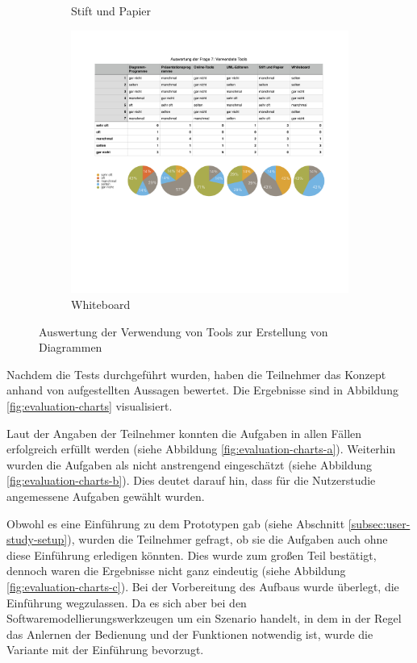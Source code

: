\begin{figure}[hbt]
\begin{minipage}{.65\textwidth}
\begin{subfigure}[t]{\subfigurewidth}
        \caption{Stift und Papier}
        \label{fig:used-tools-charts-e}
    \end{subfigure}
    \begin{subfigure}[t]{\subfigurewidth}
        \centering
        \includegraphics[scale=\graphicsscale]{assets/used-tools-charts-f}
        \caption{Whiteboard}
        \label{fig:used-tools-charts-f}
    \end{subfigure}
\end{minipage}
\caption{Auswertung der Verwendung von Tools zur Erstellung von Diagrammen}
\label{fig:used-tools-charts}
\end{figure}

Nachdem die Tests durchgeführt wurden, haben die Teilnehmer das Konzept anhand von aufgestellten Aussagen bewertet. Die Ergebnisse sind in Abbildung \ref{fig:evaluation-charts} visualisiert.

Laut der Angaben der Teilnehmer konnten die Aufgaben in allen Fällen erfolgreich erfüllt werden (siehe Abbildung \ref{fig:evaluation-charts-a}). Weiterhin wurden die Aufgaben als nicht anstrengend eingeschätzt (siehe Abbildung \ref{fig:evaluation-charts-b}). Dies deutet darauf hin, dass für die Nutzerstudie angemessene Aufgaben gewählt wurden.

Obwohl es eine Einführung zu dem Prototypen gab (siehe Abschnitt \ref{subsec:user-study-setup}), wurden die Teilnehmer gefragt, ob sie die Aufgaben auch ohne diese Einführung erledigen könnten. Dies wurde zum großen Teil bestätigt, dennoch waren die Ergebnisse nicht ganz eindeutig (siehe Abbildung \ref{fig:evaluation-charts-c}). Bei der Vorbereitung des Aufbaus wurde überlegt, die Einführung wegzulassen. Da es sich aber bei den Softwaremodellierungswerkzeugen um ein Szenario handelt, in dem in der Regel das Anlernen der Bedienung und der Funktionen notwendig ist, wurde die Variante mit der Einführung bevorzugt.


